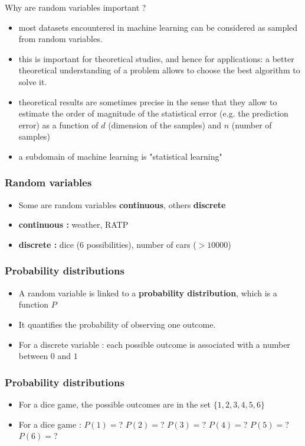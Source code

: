 \documentclass[usenames,dvipsnames,french]{beamer}
\begin{document}
\begin{frame}{Why are random variables important ?}

    \begin{itemize}
    	\item most datasets encountered in machine learning can be considered as sampled from random variables.
	\item this is important for theoretical studies, and hence for applications: a better theoretical understanding of a problem allows to choose the best algorithm to solve it.
	\item theoretical results are sometimes precise in the sense that they allow to estimate the order of magnitude of the statistical error (e.g. the prediction error) as a function of $d$ (dimension of the samples) and $n$ (number of samples)
	\item a subdomain of machine learning is "statistical learning"
    \end{itemize}

\end{frame}

\begin{frame}
\frametitle{Random variables}
\begin{itemize}
	\item Some are random variables \textbf{continuous}, others \textbf{discrete}
	\item	\textbf{continuous : }weather, RATP
	\item	\textbf{discrete : }dice (6 possibilities), number of cars ($>10000$)
\end{itemize}
\end{frame}

\begin{frame}
\frametitle{Probability distributions}

\begin{itemize}
	\item A random variable is linked to a \textbf{probability distribution}, which is a function $P$
	\item It quantifies the probability of observing one outcome.
	\item	For a discrete variable : each possible outcome is associated with a number between $0$ and $1$
\end{itemize}
\end{frame}

\begin{frame}
\frametitle{Probability distributions}
\begin{itemize}
	\item	For a dice game, the possible outcomes are  in the set $\{1,2,3,4,5,6\}$
	\item For a dice game : $P(1)= $? $P(2)= $? $P(3)= $? $P(4)= $? $P(5)= $? $P(6)= $?
\end{itemize}
\end{frame}
\end{document}
